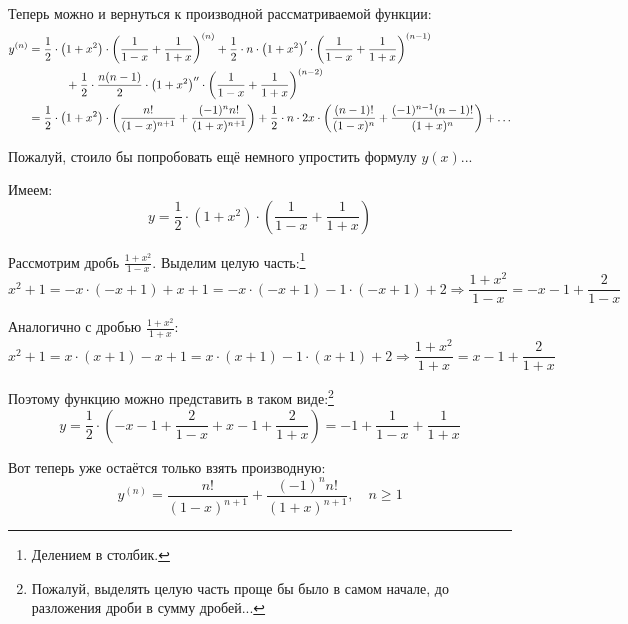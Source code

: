 \documentclass[a4paper,12pt]{article}
\begin{document}
\begin{solution}
    Теперь можно и вернуться к производной рассматриваемой функции:
    \begin{equation*}
    \begin{split}
      y^{(n)} &= \frac{1}{2} \cdot \left(1 + x^2\right) \cdot \left(\frac{1}{1 - x} + \frac{1}{1 + x}\right)^{(n)}
        + \frac{1}{2} \cdot n \cdot \left(1 + x^2\right)' \cdot \left(\frac{1}{1 - x} + \frac{1}{1 + x}\right)^{(n - 1)}\\
        &\hphantom{MMM} + \frac{1}{2} \cdot \frac{n(n - 1)}{2} \cdot \left(1 + x^2\right)'' \cdot \left(\frac{1}{1 - x} + \frac{1}{1 + x}\right)^{(n - 2)}\\
        &= \frac{1}{2} \cdot \left(1 + x^2\right) \cdot \left(
          \frac{n!}{(1 - x)^{n + 1}} + \frac{(-1)^n n!}{(1 + x)^{n + 1}}
        \right)
        + \frac{1}{2} \cdot n \cdot 2x \cdot \left(
          \frac{(n - 1)!}{(1 - x)^{n}} + \frac{(-1)^{n - 1} (n - 1)!}{(1 + x)^{n}}
        \right)
        + \ldots
    \end{split}
    \end{equation*}

     Пожалуй, стоило бы попробовать ещё немного упростить формулу $y(x)$...

     Имеем:
     \[
       y = \frac{1}{2} \cdot \left(1 + x^2\right) \cdot \left(\frac{1}{1 - x} + \frac{1}{1 + x}\right)
     \]

     Рассмотрим дробь $\frac{1 + x^2}{1 - x}$.
     Выделим целую часть:\footnote{
       Делением в столбик.
     }
     \[
       x^2 + 1 = -x \cdot (-x + 1) + x + 1 = -x \cdot (-x + 1) - 1 \cdot (-x + 1) + 2
         \Rightarrow \frac{1 + x^2}{1 - x} = -x - 1 + \frac{2}{1 - x}
     \]

     Аналогично с дробью $\frac{1 + x^2}{1 + x}$:
     \[
       x^2 + 1 = x \cdot (x + 1) - x + 1 = x \cdot (x + 1) - 1 \cdot (x + 1) + 2
         \Rightarrow \frac{1 + x^2}{1 + x} = x - 1 + \frac{2}{1 + x}
     \]

     Поэтому функцию можно представить в таком виде:\footnote{
       Пожалуй, выделять целую часть проще бы было в самом начале, до разложения дроби в сумму дробей...
     }
     \[
       y = \frac{1}{2} \cdot \left(-x - 1 + \frac{2}{1 - x} + x - 1 + \frac{2}{1 + x}\right)
         = -1 + \frac{1}{1 - x} + \frac{1}{1 + x}
     \]

     Вот теперь уже остаётся только взять производную:
     \[
       y^{(n)} = \frac{n!}{(1 - x)^{n + 1}} + \frac{(-1)^n n!}{(1 + x)^{n + 1}},\quad n \geq 1
     \]
  \end{solution}
\end{document}
